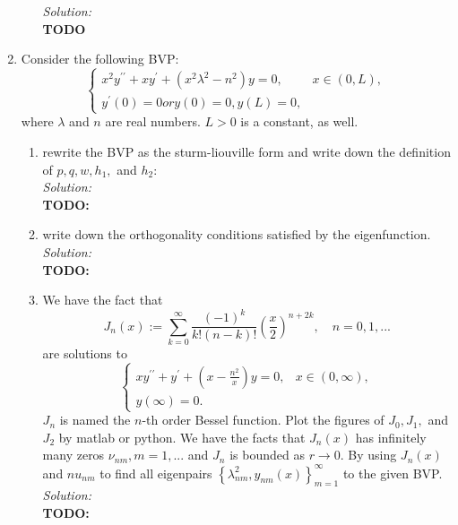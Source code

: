 \documentclass[10pt]{amsart}
\theoremstyle{nonumberplain}
\begin{document}
\begin{enumerate}[label={\bf {\arabic*}:}]
\begin{enumerate}
\noindent
\textit{Solution:} \\
\textbf{TODO} \\

\end{enumerate}

\newpage

\item Consider the following BVP:
$$
\begin{cases}
x^2y^{\prime\prime} + xy^\prime + (x^2\lambda^2 - n^2)y = 0, &x \in (0, L), \\
y^\prime(0) = 0 or y(0) = 0, y(L) = 0,
\end{cases}
$$
where $\lambda$ and $n$ are real numbers.
$L > 0$ is a constant, as well.

\begin{enumerate}
\item rewrite the BVP as the sturm-liouville form and write down the definition of $p, q, w, h_1,$ and $h_2$: \\

\noindent
\textit{Solution:} \\
\textbf{TODO:} \\

\item write down the orthogonality conditions satisfied by the eigenfunction. \\

\noindent
\textit{Solution:} \\
\textbf{TODO:} \\

\item We have the fact that
$$
J_n(x) := \sum_{k = 0}^\infty\frac {(-1)^k}{k!(n - k)! } \left( \frac  x 2 \right)^{n + 2k}, \quad n = 0, 1, ...
$$
are solutions to 
$$
\begin{cases}
xy^{\prime\prime} + y^\prime + (x - \frac{n^2} x )y = 0, &x \in (0, \infty), \\
y(\infty) = 0.
\end{cases}
$$
$J_n$ is named the $n$-th order Bessel function.
Plot the figures of $J_0, J_1,$ and $J_2$ by matlab or python.
We have the facts that $J_n(x)$ has infinitely many zeros $\nu_{nm}, m = 1, ...$ and $J_n$ is bounded as $r \rightarrow 0$.
By using $J_n(x)$ and $nu_{nm}$ to find all eigenpairs $\left\{\lambda_{nm}^2, y_{nm}(x) \right\}_{m = 1}^\infty$ to the given BVP. \\

\noindent
\textit{Solution:} \\
\textbf{TODO:} \\


\end{enumerate}
\end{enumerate}
\end{document}
